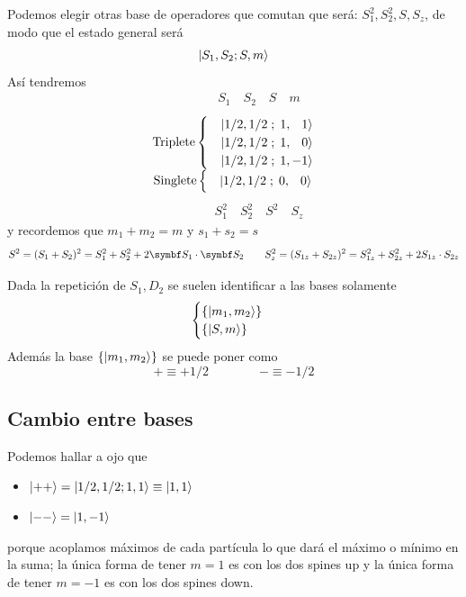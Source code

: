 \documentclass[10pt,oneside]{CBFT_book}
\begin{document}
Podemos elegir otras base de operadores que comutan que será: $S_ 1^2, S_2^2, S, S_{z}$, de modo
que el estado general será
\[
	\Ket{S_1, S_2;S,m}
\]
Así tendremos
\[
	\begin{matrix} \qquad\qquad S_1 \quad S_2 \quad S \quad m \end{matrix}
\]
\[
	\begin{matrix}
	\text{Triplete}\begin{cases}	
	&\Ket{1/2, 1/2 \; ; \; 1, \phantom{-}1} \\
	&\Ket{1/2, 1/2 \; ; \; 1, \phantom{-}0} \\
	&\Ket{1/2, 1/2 \; ; \; 1, -1} \\
	\end{cases}
	\\
	\text{Singlete}\begin{cases}
	&\Ket{1/2, 1/2 \; ; \; 0, \phantom{-}0} \\
	\end{cases}		
	\end{matrix}	 
\]	
\[	
	\begin{matrix} \qquad\qquad S_1^2 \quad S_2^2 \quad S^2 \quad S_z  \end{matrix}
\]
y recordemos que $m_1+m_2=m$ y $s_1+s_2=s$
\[
	S^2 = (S_1 + S_2)^2  = S_1^2 + S_2^2 + 2\vb{S}_1\cdot\vb{S}_2 \qquad 
	S^2_z = (S_{1z} + S_{2z})^2  = S_{1z}^2 + S_{2z}^2 + 2S_{1z}\cdot S_{2z}
\]

Dada la repetición de $S_1,D_2$ se suelen identificar a las bases solamente 
\[
	\begin{cases}
	\{ \Ket{m_1,m_2} \} \\
	\{ \Ket{S,m} \}
	\end{cases}
\]
Además la base $\{ \Ket{m_1,m_2}\}$ se puede poner como 
\[
	+ \equiv + 1/2 \qquad\qquad - \equiv - 1/2
\]

\subsection{Cambio entre bases}

Podemos hallar a ojo que 
\begin{itemize}
 \item $\Ket{++} = \Ket{1/2, 1/2; 1, 1} \equiv \Ket{1,1}$
 \item $\Ket{--} = \Ket{1,-1}$
\end{itemize}
porque acoplamos máximos de cada partícula lo que dará el máximo o mínimo en la suma; 
la única forma de tener $m=1$ es con los dos spines up y la única forma de tener $m=-1$ 
es con los dos spines down.
\end{document}
